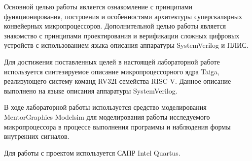 \Introduction

Основной целью работы является ознакомление с принципами функционирования, построения и особенностями архитектуры суперскалярных конвейерных микропроцессоров. Дополнительной целью работы является знакомство с принципами проектирования и верификации сложных цифровых устройств с использованием языка описания аппаратуры SystemVerilog и ПЛИС.

Для достижения поставленных целей в настоящей лабораторной работе используется синтезируемое описание микропроцессорного ядра Taiga, реализующего систему команд RV32I семейства RISC-V. Данное описание выполнено на языке описания аппаратуры SystemVerilog.

В ходе лабораторной работы используется средство моделирования MentorGraphics Modelsim для моделирования работы исследуемого микропроцессора в процессе выполнения программы и наблюдения формы внутренних сигналов.

Для работы с проектом используется САПР Intel Quartus.
